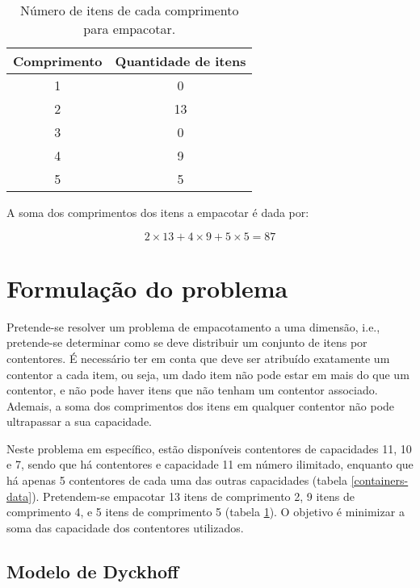 \documentclass[12pt, a4paper, titlepage]{article}
\begin{document}
\begin{table}[H]
    \begin{center}
        \begin{tabular}{c|c}
            Comprimento & Quantidade de itens \\
            \hline
            1           & 0                    \\
            2           & 13                   \\
            3           & 0                    \\
            4           & 9                    \\
            5           & 5
        \end{tabular}
    \end{center}
    \caption{Número de itens de cada comprimento para empacotar.}
    \label{items-data}
\end{table}

A soma dos comprimentos dos itens a empacotar é dada por:

$$2 \times 13 + 4 \times 9 + 5 \times 5 = 87$$

\section{Formulação do problema}

Pretende-se resolver um problema de empacotamento a uma dimensão, i.e., pretende-se determinar como
se deve distribuir um conjunto de itens por contentores. É necessário ter em conta que deve ser
atribuído exatamente um contentor a cada item, ou seja, um dado item não pode estar em mais do que
um contentor, e não pode haver itens que não tenham um contentor associado. Ademais, a soma dos
comprimentos dos itens em qualquer contentor não pode ultrapassar a sua capacidade.

Neste problema em específico, estão disponíveis contentores de capacidades 11, 10 e 7, sendo que há
contentores e capacidade 11 em número ilimitado, enquanto que há apenas 5 contentores de cada uma
das outras capacidades (tabela \ref{containers-data}). Pretendem-se empacotar 13 itens de
comprimento 2, 9 itens de comprimento 4, e 5 itens de comprimento 5 (tabela \ref{items-data}). O
objetivo é minimizar a soma das capacidade dos contentores utilizados.

\subsection{Modelo de Dyckhoff}
\end{document}
